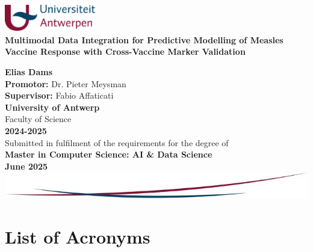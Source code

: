 \documentclass[12pt,a4paper]{report}
\begin{document}
\begin{titlepage}
    \centering
    
    \includegraphics[width=0.3\textwidth]{images/uantwerp_logo.png}\\[1cm]
    
    {\Huge \textbf{Multimodal Data Integration for Predictive Modelling of Measles Vaccine Response with Cross-Vaccine Marker Validation}} \\
    \vfill
    
    {\Large \textbf{Elias Dams}}\\[1cm]
    
    \textbf{Promotor:} Dr. Pieter Meysman\\
    \textbf{Supervisor:} Fabio Affaticati\\[1.5cm]
    
    {\Large \textbf{University of Antwerp}}\\
    {\large Faculty of Science}\\[0.5cm]
    
    \textbf{2024-2025}\\[1.5cm]
    
    Submitted in fulfilment of the requirements for the degree of\\
    \textbf{Master in Computer Science: AI \& Data Science}\\[1cm]
    
    \textbf{June 2025}\\[2cm]
    
    \vfill
    \includegraphics[width=1.0\textwidth]{images/bottom_design.jpg}

\end{titlepage}

\tableofcontents
\newpage

\listoffigures

\listoftables

\chapter*{List of Acronyms}
\end{document}
